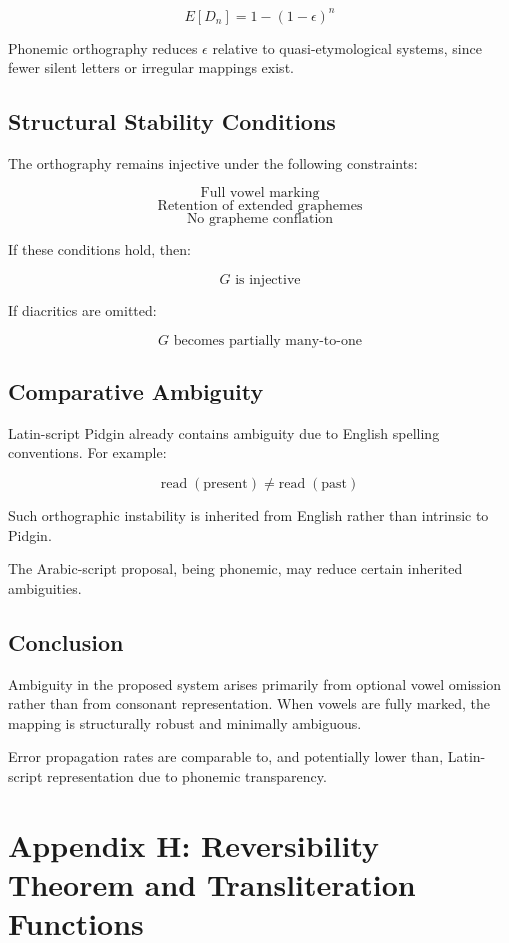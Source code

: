 \documentclass[12pt]{article}
\begin{document}
\[
E[D_n] = 1 - (1-\epsilon)^n
\]

Phonemic orthography reduces \( \epsilon \) relative to quasi-etymological systems, since fewer silent letters or irregular mappings exist.

\subsection{Structural Stability Conditions}

The orthography remains injective under the following constraints:

\[
\text{Full vowel marking}
\]
\[
\text{Retention of extended graphemes}
\]
\[
\text{No grapheme conflation}
\]

If these conditions hold, then:

\[
G \text{ is injective}
\]

If diacritics are omitted:

\[
G \text{ becomes partially many-to-one}
\]

\subsection{Comparative Ambiguity}

Latin-script Pidgin already contains ambiguity due to English spelling conventions. For example:

\[
\text{read} \; (\text{present}) \neq \text{read} \; (\text{past})
\]

Such orthographic instability is inherited from English rather than intrinsic to Pidgin.

The Arabic-script proposal, being phonemic, may reduce certain inherited ambiguities.

\subsection{Conclusion}

Ambiguity in the proposed system arises primarily from optional vowel omission rather than from consonant representation. When vowels are fully marked, the mapping is structurally robust and minimally ambiguous.

Error propagation rates are comparable to, and potentially lower than, Latin-script representation due to phonemic transparency.

\section{Appendix H: Reversibility Theorem and Transliteration Functions}
\end{document}
